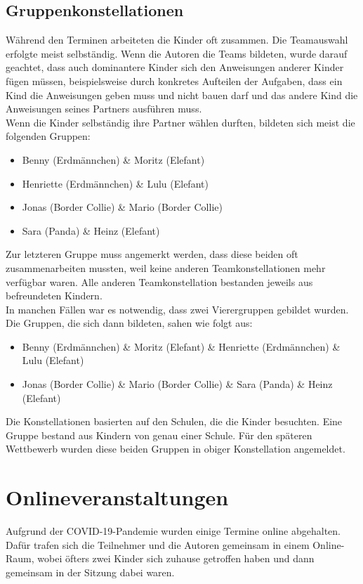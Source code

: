 \subsection{Gruppenkonstellationen}
Während den Terminen arbeiteten die Kinder oft zusammen. Die Teamauswahl erfolgte meist selbständig. Wenn die Autoren die Teams bildeten, wurde darauf geachtet, dass auch dominantere Kinder sich den Anweisungen anderer Kinder fügen müssen, beispielsweise durch konkretes Aufteilen der Aufgaben, dass ein Kind die Anweisungen geben muss und nicht bauen darf und das andere Kind die Anweisungen seines Partners ausführen muss.\\
Wenn die Kinder selbständig ihre Partner wählen durften, bildeten sich meist die folgenden Gruppen:\\
\begin{itemize}
	\item Benny (Erdmännchen) \& Moritz (Elefant)
	\item Henriette (Erdmännchen) \& Lulu (Elefant)
	\item Jonas (Border Collie) \& Mario (Border Collie)
	\item Sara (Panda) \& Heinz (Elefant)
\end{itemize}
Zur letzteren Gruppe muss angemerkt werden, dass diese beiden oft zusammenarbeiten mussten, weil keine anderen Teamkonstellationen mehr verfügbar waren. Alle anderen Teamkonstellation bestanden jeweils aus befreundeten Kindern.\\
In manchen Fällen war es notwendig, dass zwei Vierergruppen gebildet wurden. Die Gruppen, die sich dann bildeten, sahen wie folgt aus:
\begin{itemize}
	\item Benny (Erdmännchen) \& Moritz (Elefant) \& Henriette (Erdmännchen) \& Lulu (Elefant)
	\item Jonas (Border Collie) \& Mario (Border Collie) \& Sara (Panda) \& Heinz (Elefant)
\end{itemize}
Die Konstellationen basierten auf den Schulen, die die Kinder besuchten. Eine Gruppe bestand aus Kindern von genau einer Schule. Für den späteren Wettbewerb wurden diese beiden Gruppen in obiger Konstellation angemeldet.\\


\section{Onlineveranstaltungen}
Aufgrund der COVID-19-Pandemie wurden einige Termine online abgehalten. Dafür trafen sich die Teilnehmer und die Autoren gemeinsam in einem Online-Raum, wobei öfters zwei Kinder sich zuhause getroffen haben und dann gemeinsam in der Sitzung dabei waren.



